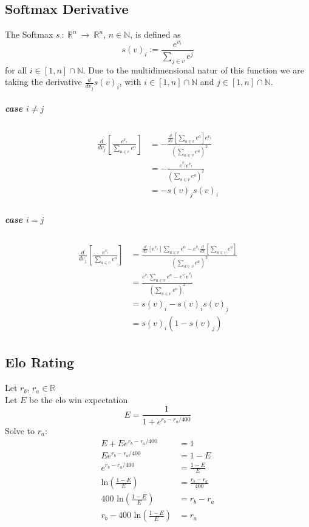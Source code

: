 \documentclass[12pt]{article}
\begin{document}
\subsection{Softmax Derivative}
The Softmax \(s~:~\mathbb R^n~\to~\mathbb R^n\), \(n\in\mathbb N\), is defined as
\begin{equation} \label{eq:proof:softmax}
s(v)_i := \frac{e^{v_i}}{\sum_{j \in v} e^j}
\end{equation}
for all \(i \in [1,n]\cap\mathbb N\). Due to the multidimensional natur of this function we are taking the derivative \(\frac{d}{dv_j}s(v)_i\), with \(i \in [1,n]\cap\mathbb N\) and \(j \in [1,n]\cap\mathbb N\). 
\subparagraph*{case \(i \neq j\)}
\begin{align}
\begin{split}
\frac{d}{dv_j}\left[\frac{e^{v_i}}{\sum_{a \in v} e^a}\right] &= -\frac{\frac{d}{dx}\left[\sum_{a \in v} e^a\right]e^{v_i}}{(\sum_{a \in v} e^a)^2}\\
&= -\frac{e^{v_j} e^{v_i}}{(\sum_{a \in v} e^a)^2}\\
&= -s(v)_j s(v)_i
\end{split}
\end{align}
\subparagraph*{case \(i = j\)}
\begin{align}
\begin{split}
\frac{d}{dv_j}\left[\frac{e^{v_i}}{\sum_{a \in v} e^a}\right] 
&= \frac{\frac{d}{dx}\left[e^{v_i}\right]\sum_{a \in v} e^a - e^{v_i}\frac{d}{dx}\left[\sum_{a \in v} e^a\right]}{(\sum_{a \in v} e^a)^2}\\
&= \frac{e^{v_i}\sum_{a \in v} e^a - e^{v_i}e^{v_j}}{(\sum_{a \in v} e^a)^2}\\
&= s(v)_i - s(v)_i s(v)_j\\
&= s(v)_i (1 - s(v)_j)
\end{split}
\end{align}

\subsection{Elo Rating}\label{sec:eloGet}
Let \(r_b\), \(r_a \in \mathbb R\)\\
Let \(E\) be the elo win expectation
\begin{equation}
E = \frac{1}{1+e^{r_b - r_a/400}}
\end{equation}
Solve to \(r_a\):
\begin{align}
E + Ee^{r_b - r_a/400} &= 1\\
Ee^{r_b - r_a/400} &= 1 - E\\
e^{r_b - r_a/400} &= \frac{1 - E}{E}\\
\text{ln}\left(\frac{1 - E}{E}\right) &= \frac{r_b - r_a}{400}\\
400 \text{ ln}\left(\frac{1 - E}{E}\right) &= r_b - r_a\\
r_b - 400 \text{ ln}\left(\frac{1 - E}{E}\right)  &= r_a
\end{align}
\end{document}
